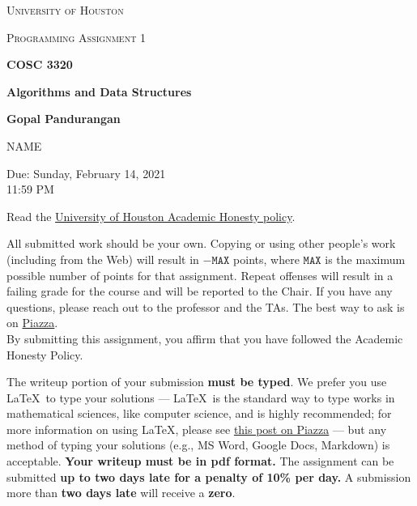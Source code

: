 \documentclass[draft]{article}
\begin{document}
\begin{titlepage}
    \begin{center}
        {\scshape\LARGE University of Houston\par}
        \vspace{1cm}
        {\scshape\Large Programming Assignment 1 \par}
        \vspace{1.5cm}
        {\huge\bfseries COSC 3320 \par}
        {\huge\bfseries Algorithms and Data Structures \par}
        \vspace{0.5cm}
        {\large\bfseries Gopal Pandurangan\par}
        \vspace{2cm}
        {\Large NAME\par}
        \vspace{0.5cm}
        {\large \par} Due: Sunday, February 14, 2021\\11:59 PM
    \end{center}


    Read the \href{https://www.uh.edu/provost/policies-resources/honesty/_documents-honesty/academic-honesty-policy.pdf}{University of Houston Academic Honesty policy}.

    \begin{tcolorbox}[title=Academic Honesty Policy,colback=red!15,colframe=red!65!black,fonttitle=\bfseries]All submitted work should be your own. Copying or using other people's work (including from the Web) will result in \(-\texttt{MAX}\) points, where \(\texttt{MAX}\) is the maximum possible number of points for that assignment. Repeat offenses will result in a failing grade for the course and will be reported to the Chair. If you have any questions, please reach out to the professor and the TAs. The best way to ask is on \href{https://piazza.com/uh/spring2021/cosc3320/home}{Piazza}.\\

        By submitting this assignment, you affirm that you have followed the Academic Honesty Policy.
    \end{tcolorbox}

    The writeup portion of your submission \textbf{must be typed}. We prefer you use \LaTeX~to type your solutions --- \LaTeX~is the standard way to type works in mathematical sciences, like computer science, and is highly recommended; for more information on using \LaTeX, please see \href{https://piazza.com/class/kjxhee6ctqe6cj?cid=8}{this post on Piazza} --- but any method of typing your solutions (e.g., MS Word, Google Docs, Markdown) is acceptable. \textbf{Your writeup must be in pdf format.} The assignment can be submitted \textbf{up to two days late for a penalty of 10\% per day.} A submission more than \textbf{two days late} will receive a \textbf{zero}.


\end{titlepage}
\end{document}
